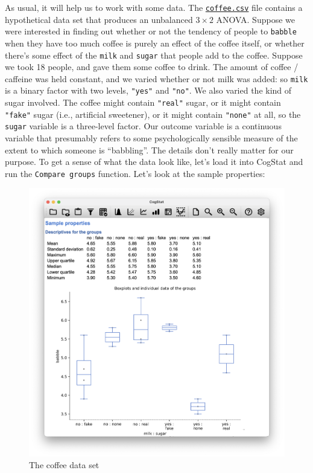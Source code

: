 \documentclass[
]{book}
\theoremstyle{definition}
\theoremstyle{definition}
\theoremstyle{definition}
\theoremstyle{definition}
\theoremstyle{remark}
\begin{document}
As usual, it will help us to work with some data. The \href{resources/data/coffee.csv}{\texttt{coffee.csv}} file contains a hypothetical data set that produces an unbalanced \(3 \times 2\) ANOVA. Suppose we were interested in finding out whether or not the tendency of people to \texttt{babble} when they have too much coffee is purely an effect of the coffee itself, or whether there's some effect of the \texttt{milk} and \texttt{sugar} that people add to the coffee. Suppose we took 18 people, and gave them some coffee to drink. The amount of coffee / caffeine was held constant, and we varied whether or not milk was added: so \texttt{milk} is a binary factor with two levels, \texttt{"yes"} and \texttt{"no"}. We also varied the kind of sugar involved. The coffee might contain \texttt{"real"} sugar, or it might contain \texttt{"fake"} sugar (i.e., artificial sweetener), or it might contain \texttt{"none"} at all, so the \texttt{sugar} variable is a three-level factor. Our outcome variable is a continuous variable that presumably refers to some psychologically sensible measure of the extent to which someone is ``babbling''. The details don't really matter for our purpose. To get a sense of what the data look like, let's load it into CogStat and run the \texttt{Compare\ groups} function. Let's look at the sample properties:

\begin{figure}

{\centering \includegraphics[width=0.66\linewidth]{resources/image/cogstatcoffeedescr} 

}

\caption{The coffee data set}\label{fig:unnamed-chunk-88}
\end{figure}
\end{document}
